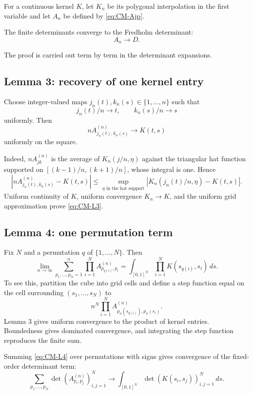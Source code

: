 For a continuous kernel \(K\), let \(K_n\) be its polygonal interpolation in the first variable and let \(A_n\) be defined by \eqref{eq:CM-Ajp}.

\begin{lemma}[Lemma 2]
The finite determinants converge to the Fredholm determinant:
\[
 A_n\longrightarrow D.
\]
\end{lemma}

The proof is carried out term by term in the determinant expansions.

\subsection{Lemma 3: recovery of one kernel entry}
Choose integer-valued maps \(j_n(t),k_n(s)\in\{1,\ldots,n\}\) such that
\[
 j_n(t)/n\to t,
 \qquad
 k_n(s)/n\to s
\]
uniformly.  Then
\begin{equation}
 nA^{(n)}_{j_n(t),k_n(s)}\longrightarrow K(t,s)
 \tag{5.4}\label{eq:CM-L3}
\end{equation}
uniformly on the square.

Indeed, \(nA_{jk}^{(n)}\) is the average of \(K_n(j/n,\eta)\) against the triangular hat function supported on \([(k-1)/n,(k+1)/n]\), whose integral is one.  Hence
\[
 |nA^{(n)}_{j_n(t),k_n(s)}-K(t,s)|
 \le \sup_{\eta\text{ in the hat support}}
 |K_n(j_n(t)/n,\eta)-K(t,s)|.
\]
Uniform continuity of \(K\), uniform convergence \(K_n\to K\), and the uniform grid approximation prove \eqref{eq:CM-L3}.

\subsection{Lemma 4: one permutation term}
Fix \(N\) and a permutation \(q\) of \(\{1,\ldots,N\}\).  Then
\begin{equation}
 \lim_{n\to\infty}
 \sum_{p_1,\ldots,p_N=1}^n
 \prod_{i=1}^NA^{(n)}_{p_{q(i)},p_i}
 =\int_{[0,1]^N}\prod_{i=1}^NK(s_{q(i)},s_i)\,ds.
 \tag{6.1}\label{eq:CM-L4}
\end{equation}
To see this, partition the cube into grid cells and define a step function equal on the cell surrounding \((s_1,\ldots,s_N)\) to
\[
 n^N\prod_{i=1}^NA^{(n)}_{p_n(s_{q(i)}),p_n(s_i)}.
\]
Lemma 3 gives uniform convergence to the product of kernel entries.  Boundedness gives dominated convergence, and integrating the step function reproduces the finite sum.

Summing \eqref{eq:CM-L4} over permutations with signs gives convergence of the fixed-order determinant term:
\[
 \sum_{p_1,\ldots,p_N}\det(A^{(n)}_{p_i,p_j})_{i,j=1}^N
 \longrightarrow
 \int_{[0,1]^N}\det(K(s_i,s_j))_{i,j=1}^N\,ds.
\]

